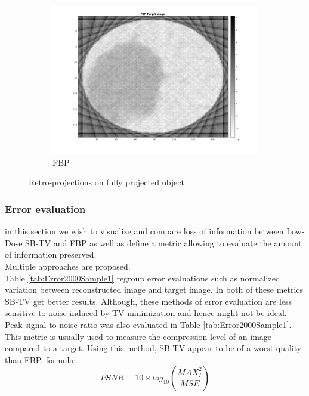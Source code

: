 \documentclass[10pt,a4paper,titlepage]{article}
\begin{document}
\begin{figure}[H]
\begin{subfigure}[b]{0.32\textwidth}
            	\centering 
            	\includegraphics[width=\textwidth]{Sample1/L-D_5000/FBP16.png}
            	\caption{FBP}    
            	\label{subfig:FBP116p}
        	\end{subfigure}
       		
       		
       		
        	\caption{Retro-projections on fully projected object}
        	\label{fig:retFully}
        	
    	\end{figure}
\clearpage

	\subsubsection{Error evaluation}
		in this section we wish to visualize and compare loss of information between Low-Dose SB-TV and FBP as well as define a metric allowing to evaluate the amount of information preserved.\\
		Multiple approaches are proposed.\\	
			
		Table \ref{tab:Error2000Sample1} regroup error evaluations such as normalized variation between reconstructed image and target image. In both of these metrics SB-TV get better results. Although, these methods of error evaluation are less sensitive to noise induced by TV minimization and hence might not be ideal.\\
		
		Peak signal to noise ratio was also evaluated in Table \ref{tab:Error2000Sample1}. This metric is usually  used to measure the compression level of an image compared to a target. Using this method, SB-TV appear to be of a worst quality than FBP. formula: $$ PSNR = 10 \times log_10\left(\frac{MAX_I^2}{MSE}\right)$$\\
		
\end{document}
